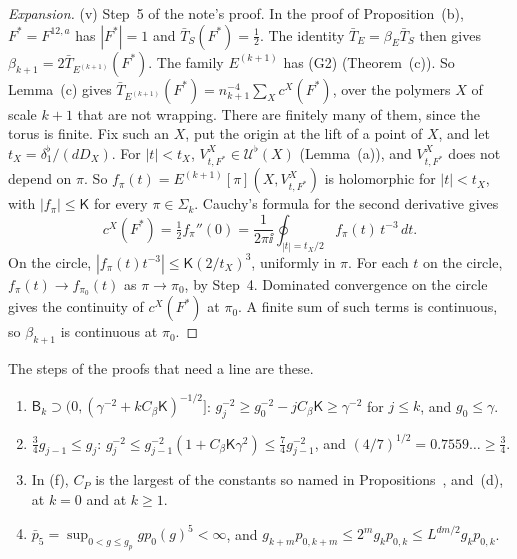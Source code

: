 \begin{proof}[Expansion]
(v) Step~5 of the note's proof. In the proof of Proposition~(b), $F^*=F^{12,a}$ has $|F^*|=1$ and $\bar T_S(F^*)=\frac12$. The identity $\bar T_E=\beta_E\bar T_S$ then gives $\beta_{k+1}=2\bar T_{E^{(k+1)}}(F^*)$. The family $E^{(k+1)}$ has (G2) (Theorem~(c)). So Lemma~(c) gives $\bar T_{E^{(k+1)}}(F^*)=n_{k+1}^{-4}\sum_Xc^X(F^*)$, over the polymers $X$ of scale $k+1$ that are not wrapping. There are finitely many of them, since the torus is finite. Fix such an $X$, put the origin at the lift of a point of $X$, and let $t_X=\delta_1^\flat/(dD_X)$. For $|t|<t_X$, $V^X_{t,F^*}\in\mathcal U^\flat(X)$ (Lemma~(a)), and $V^X_{t,F^*}$ does not depend on $\pi$. So $f_\pi(t)=E^{(k+1)}[\pi](X,V^X_{t,F^*})$ is holomorphic for $|t|<t_X$, with $|f_\pi|\le\mathsf K$ for every $\pi\in\Sigma_k$. Cauchy's formula for the second derivative gives
\[
c^X(F^*)=\tfrac12f_\pi''(0)=\frac1{2\pi\ii}\oint_{|t|=t_X/2}f_\pi(t)\,t^{-3}\,dt .
\]
On the circle, $|f_\pi(t)t^{-3}|\le\mathsf K(2/t_X)^3$, uniformly in $\pi$. For each $t$ on the circle, $f_\pi(t)\to f_{\pi_0}(t)$ as $\pi\to\pi_0$, by Step~4. Dominated convergence on the circle gives the continuity of $c^X(F^*)$ at $\pi_0$. A finite sum of such terms is continuous, so $\beta_{k+1}$ is continuous at $\pi_0$.
\end{proof}

\begin{detail}\label{xb:d-sfflow}
The steps of the proofs that need a line are these.
\begin{enumerate}[label=(\alph*)]
\item $\mathsf B_k\supset(0,(\gamma^{-2}+kC_\beta\mathsf K)^{-1/2}]$: $g_j^{-2}\ge g_0^{-2}-jC_\beta\mathsf K\ge\gamma^{-2}$ for $j\le k$, and $g_0\le\gamma$.
\item $\frac34g_{j-1}\le g_j$: $g_j^{-2}\le g_{j-1}^{-2}(1+C_\beta\mathsf K\gamma^2)\le\frac74g_{j-1}^{-2}$, and $(4/7)^{1/2}=0.7559\ldots\ge\frac34$.
\item In (f), $C_P$ is the largest of the constants so named in Propositions~,  and~(d), at $k=0$ and at $k\ge1$.
\item $\bar p_5=\sup_{0<g\le g_p}gp_0(g)^5<\infty$, and $g_{k+m}p_{0,k+m}\le2^mg_kp_{0,k}\le L^{dm/2}g_kp_{0,k}$.
\end{enumerate}
\end{detail}

